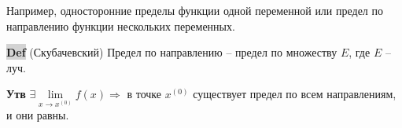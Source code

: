 \documentclass{article}
\newcommand{\bb}{\textbf}
\begin{document}
\begin{figure}[h!]
    \centering
\end{figure}
Например, односторонние пределы функции одной переменной или предел по направлению функции нескольких переменных.
\newpage

{\bfseries\colorbox{lightgray}{Def}} (Скубачевский) Предел по направлению -- предел по множеству $E$, где $E$ -- луч.

\bb{Утв} $\exists \lim\limits_{x\to x^{(0)}} f(x) \Rightarrow$ в точке $x^{(0)}$ существует предел по всем направлениям, и они равны.
\end{document}
